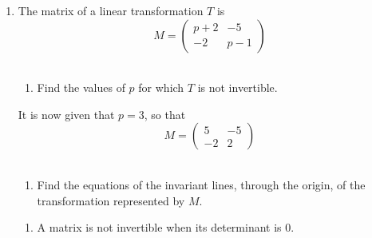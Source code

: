 \documentclass[leqno]{article}
\newcommand{\questionitem}{%
  \item\phantomsection
  \addcontentsline{toc}{section}{Question \number\value{enumi}}%
}
\begin{document}
\begin{enumerate}[
  label=\textbf{\arabic*.},
  leftmargin=*,
  topsep=0pt,
  partopsep=0pt,
  parsep=0pt
]
\begin{tcolorbox}[colback=white, colframe=scarlet, title={\textbf{Solution}}, breakable, grow to left by=6mm, grow to right by=10mm]
\begin{enumerate}[label=\textbf{(\alph*)}]
Hence
\begin{align*}
m(1-4m)&=2-m\\
m-4m^2&=2-m\\
4m^2-2m+2&=0
\end{align*}

Its discriminant is
\[
(-2)^2-4(4)(2)=4-32=-28<0
\]

So there is no real value of \(m\), and therefore no invariant non-vertical line through the origin.

From part (a),
\[
y=\frac14x \mapsto x=0
\qquad\text{and}\qquad
x=0 \mapsto y=\frac14x
\]

So neither of these two lines is invariant either.

Therefore there are no invariant lines through the origin. Since any invariant line for \(T\) must be parallel to an invariant line through the origin, \(T\) has no invariant lines.
  \end{enumerate}
\end{tcolorbox}


\newpage

\questionitem

The matrix of a linear transformation $T$ is
\[
M = \begin{pmatrix} p+2 & -5 \\[6pt] -2 & p-1 \end{pmatrix}
\] \\
\begin{enumerate}[label=\textbf{(\alph*)}]
  \item Find the values of $p$ for which $T$ is not invertible.  \\
\end{enumerate}
It is now given that $p = 3$, so that
\[
M = \begin{pmatrix} 5 & -5 \\ -2 & 2 \end{pmatrix}
\] \\
\begin{enumerate}[label=\textbf{(\alph*)}, resume]
  \item Find the equations of the invariant lines, through the origin, of the transformation represented by $M$.  \\
\end{enumerate}

\vspace*{30pt}

\begin{tcolorbox}[colback=white, colframe=scarlet, title={\textbf{Solution}}, breakable, grow to left by=6mm, grow to right by=10mm]
\begin{enumerate}[label=\textbf{(\alph*)}]
  \item A matrix is not invertible when its determinant is \(0\).


\end{enumerate}
\end{tcolorbox}
\end{enumerate}
\end{document}
